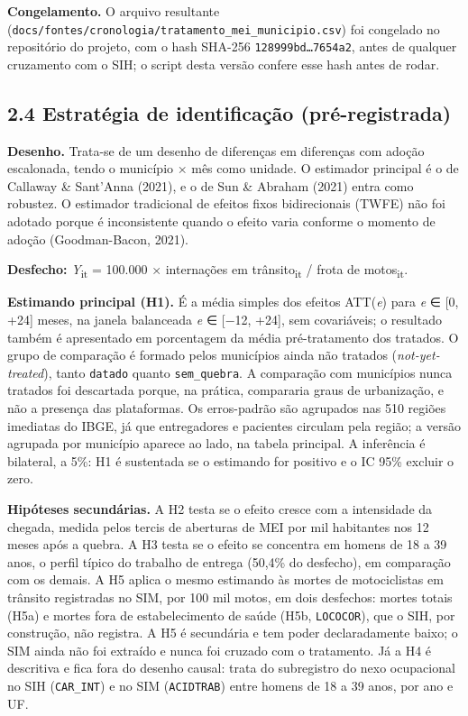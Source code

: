 \documentclass[
  11pt,
]{article}
\begin{document}
\textbf{Congelamento.} O arquivo resultante (\texttt{docs/fontes/cronologia/tratamento\_mei\_municipio.csv}) foi congelado no repositório do projeto, com o hash SHA-256 \texttt{128999bd…7654a2}, antes de qualquer cruzamento com o SIH; o script desta versão confere esse hash antes de rodar.

\hypertarget{estratuxe9gia-de-identificauxe7uxe3o-pruxe9-registrada}{%
\subsection{2.4 Estratégia de identificação (pré-registrada)}\label{estratuxe9gia-de-identificauxe7uxe3o-pruxe9-registrada}}

\textbf{Desenho.} Trata-se de um desenho de diferenças em diferenças com adoção escalonada, tendo o município × mês como unidade. O estimador principal é o de Callaway \& Sant'Anna (2021), e o de Sun \& Abraham (2021) entra como robustez. O estimador tradicional de efeitos fixos bidirecionais (TWFE) não foi adotado porque é inconsistente quando o efeito varia conforme o momento de adoção (Goodman-Bacon, 2021).

\textbf{Desfecho:} \emph{Y}\textsubscript{it} = 100.000 × internações em trânsito\textsubscript{it} / frota de motos\textsubscript{it}.

\textbf{Estimando principal (H1).} É a média simples dos efeitos ATT(\emph{e}) para \emph{e} ∈ {[}0, +24{]} meses, na janela balanceada \emph{e} ∈ {[}−12, +24{]}, sem covariáveis; o resultado também é apresentado em porcentagem da média pré-tratamento dos tratados. O grupo de comparação é formado pelos municípios ainda não tratados (\emph{not-yet-treated}), tanto \texttt{datado} quanto \texttt{sem\_quebra}. A comparação com municípios nunca tratados foi descartada porque, na prática, compararia graus de urbanização, e não a presença das plataformas. Os erros-padrão são agrupados nas 510 regiões imediatas do IBGE, já que entregadores e pacientes circulam pela região; a versão agrupada por município aparece ao lado, na tabela principal. A inferência é bilateral, a 5\%: H1 é sustentada se o estimando for positivo e o IC 95\% excluir o zero.

\textbf{Hipóteses secundárias.} A H2 testa se o efeito cresce com a intensidade da chegada, medida pelos tercis de aberturas de MEI por mil habitantes nos 12 meses após a quebra. A H3 testa se o efeito se concentra em homens de 18 a 39 anos, o perfil típico do trabalho de entrega (50,4\% do desfecho), em comparação com os demais. A H5 aplica o mesmo estimando às mortes de motociclistas em trânsito registradas no SIM, por 100 mil motos, em dois desfechos: mortes totais (H5a) e mortes fora de estabelecimento de saúde (H5b, \texttt{LOCOCOR}), que o SIH, por construção, não registra. A H5 é secundária e tem poder declaradamente baixo; o SIM ainda não foi extraído e nunca foi cruzado com o tratamento. Já a H4 é descritiva e fica fora do desenho causal: trata do subregistro do nexo ocupacional no SIH (\texttt{CAR\_INT}) e no SIM (\texttt{ACIDTRAB}) entre homens de 18 a 39 anos, por ano e UF.
\end{document}
